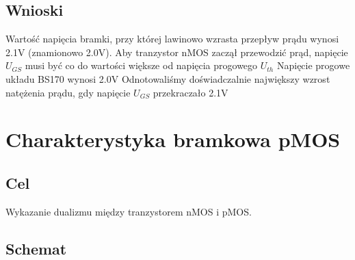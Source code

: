 \documentclass[polish,a4paper]{article}
\begin{document}
\subsection{Wnioski}
Wartość napięcia bramki, przy której lawinowo wzrasta przepływ prądu wynosi  2.1V (znamionowo 2.0V). Aby tranzystor nMOS zaczął przewodzić prąd, napięcie $U_{GS}$ musi być co do wartości większe od napięcia progowego $U_{th}$ Napięcie progowe układu BS170 wynosi 2.0V\cite{BS170} Odnotowaliśmy doświadczalnie największy wzrost natężenia prądu, gdy napięcie $U_{GS}$ przekraczało 2.1V


\section{Charakterystyka bramkowa pMOS}
\subsection{Cel} 
Wykazanie dualizmu między tranzystorem nMOS i pMOS.
\subsection{Schemat}
\end{document}
